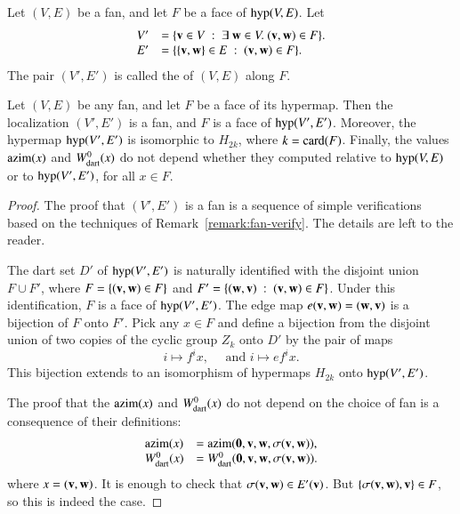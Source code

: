 \begin{definition}[localization]  Let $(V,E)$ be a fan, and let $F$ be a face of ${\operatorname{hyp}}(V,E)$.  
Let 
$$
\begin{array}{rll}
V' &= \{{\mathbf v}\in V \ :\  \exists~{\mathbf w}\in V.~({\mathbf v},{\mathbf w})\in F\}.\\
E' &= \{\{{\mathbf v},{\mathbf w}\} \in E\ :\  ({\mathbf v},{\mathbf w})\in F\}.
\end{array}
$$
The pair $(V',E')$ is called the  of $(V,E)$ along $F$.
\end{definition}
%


\begin{lemma}[localization]\label{lemma:localization}  
Let $(V,E)$ be any fan, and let $F$ be a face of its hypermap.  
Then the localization $(V',E')$ is a fan, and $F$ is a face of ${\operatorname{hyp}}(V',E')$.  Moreover, the hypermap ${\operatorname{hyp}}(V',E')$ is isomorphic
to $H_{2k}$, where $k= {\operatorname{card}}(F)$.
 Finally, the values ${\operatorname{azim}}(x)$ and $W^0_{\text{dart}}(x)$  do not depend
whether they computed relative to ${\operatorname{hyp}}(V,E)$ or to ${\operatorname{hyp}}(V',E')$, for all $x\in F$.
\end{lemma}



\begin{proof}
The proof that  $(V',E')$ is a fan is a sequence of simple verifications based on
the techniques of Remark~\ref{remark:fan-verify}.  The details are left to the reader.

The dart set $D'$ of ${\operatorname{hyp}}(V',E')$ is naturally identified with the disjoint union $F\cup F'$, where
$F = \{({\mathbf v},{\mathbf w}) \in F\}$ and $F'=\{({\mathbf w},{\mathbf v}) \ :\  ({\mathbf v},{\mathbf w})\in F\}$.  Under this identification, $F$ is a face of ${\operatorname{hyp}}(V',E')$.  The edge map $e({\mathbf v},{\mathbf w})= ({\mathbf w},{\mathbf v})$ is a bijection of $F$ onto $F'$.   Pick any $x\in F$ and
define a bijection from the disjoint union of two copies of the cyclic group $Z_k$ onto $D'$  by 
the pair of maps
$$
i \mapsto f^i x,\quad\text{ and } i\mapsto e f^i x.
$$
This bijection extends to an isomorphism of hypermaps $H_{2k}$ onto ${\operatorname{hyp}}(V',E')$.

The proof that the ${\operatorname{azim}}(x)$ and $W^0_{\text{dart}}(x)$ do not depend on the choice of fan is a consequence of their definitions:
$$
\begin{array}{lll}
{\operatorname{azim}}(x) &= {\operatorname{azim}}({\mathbf 0},{\mathbf v},{\mathbf w},\sigma({\mathbf v},{\mathbf w})),\\
W^0_{\text{dart}}(x) &= W^0_{\text{dart}}({\mathbf 0},{\mathbf v},{\mathbf w},\sigma({\mathbf v},{\mathbf w})).\\
\end{array}
$$
where $x = ({\mathbf v},{\mathbf w})$.    It is enough to check that $\sigma({\mathbf v},{\mathbf w})\in E'({\mathbf v})$. 
But $\{\sigma({\mathbf v},{\mathbf w}),{\mathbf v}\}\in F$, so this is indeed the case.
\end{proof}



